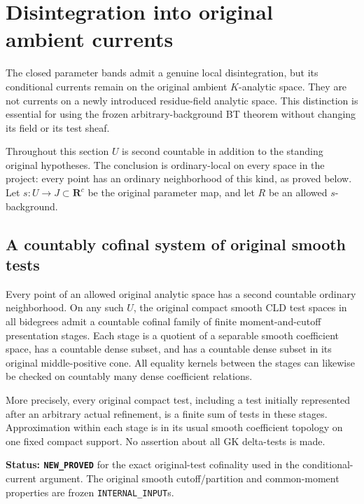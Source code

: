 \section{Disintegration into original ambient currents}
\label{sec:r12-original-current-disintegration}

The closed parameter bands admit a genuine local disintegration,
but its conditional currents remain on the original ambient
$K$-analytic space. They are not currents on a newly introduced
residue-field analytic space. This distinction is essential for
using the frozen arbitrary-background BT theorem without changing
its field or its test sheaf.

Throughout this section $U$ is second countable in addition to the
standing original hypotheses. The conclusion is ordinary-local on
every space in the project: every point has an ordinary neighborhood
of this kind, as proved below. Let $s:U\to J\subset\mathbf R^c$ be
the original parameter map, and let $R$ be an allowed $s$-background.

\subsection{A countably cofinal system of original smooth tests}

\begin{lemma}
\label{lem:r12-countably-cofinal-original-tests}
Every point of an allowed original analytic space has a second
countable ordinary neighborhood. On any such $U$, the original
compact smooth CLD test spaces in all bidegrees admit a countable
cofinal family of finite moment-and-cutoff presentation stages.
Each stage is a quotient of a separable smooth coefficient space,
has a countable dense subset, and has a countable dense subset in
its original middle-positive cone. All equality kernels between
the stages can likewise be checked on countably many dense
coefficient relations.

More precisely, every original compact test, including a test
initially represented after an arbitrary actual refinement, is a
finite sum of tests in these stages. Approximation within each
stage is in its usual smooth coefficient topology on one fixed
compact support. No assertion about all GK delta-tests is made.
\end{lemma}

\noindent\textbf{Status: \texttt{NEW\_PROVED}} for the exact
original-test cofinality used in the conditional-current argument.
The original smooth cutoff/partition and common-moment properties
are frozen \texttt{INTERNAL\_INPUT}s.

